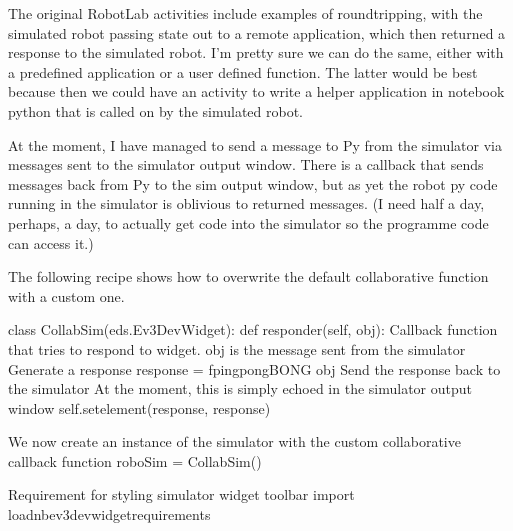 \documentclass[letterpaper,10pt,english]{sphinxmanual}
\begin{document}
The original RobotLab activities include examples of round\sphinxhyphen{}tripping, with the simulated robot passing state out to a remote application, which then returned a response to the simulated robot. I’m pretty sure we can do the same, either with a predefined application or a user defined function. The latter would be best because then we could have an activity to write a helper application in notebook python that is called on by the simulated robot.

At the moment, I have managed to send a message to Py from the simulator via messages sent to the simulator output window. There is a callback that sends messages back from Py to the sim output window, but as yet the robot py code running in the simulator is oblivious to returned messages. (I need half a day, perhaps, a day, to actually get code into the simulator so the programme code can access it.)

The following recipe shows how to overwrite the default collaborative  function with a custom one.

{
\begin{sphinxVerbatim}[commandchars=\\\{\}]
\llap{\color{nbsphinxin}[ ]:\,\hspace{\fboxrule}\hspace{\fboxsep}}class CollabSim(eds.Ev3DevWidget):
     def responder(self, obj):
        \PYGZdq{}\PYGZdq{}\PYGZdq{} Callback function that tries to respond to widget.\PYGZdq{}\PYGZdq{}\PYGZdq{}
        \PYGZsh{} obj is the message sent from the simulator
        \PYGZsh{}Generate a response
        response = f\PYGZsq{}pingpongBONG \PYGZob{}obj\PYGZcb{}\PYGZsq{}
        \PYGZsh{}Send the response back to the simulator
        \PYGZsh{}At the moment, this is simply echoed in the simulator output window
        self.set\PYGZus{}element(\PYGZdq{}response\PYGZdq{}, response)

\PYGZsh{} We now create an instance of the simulator with the custom collaborative callback function
roboSim = CollabSim()
\end{sphinxVerbatim}
}

{
\begin{sphinxVerbatim}[commandchars=\\\{\}]
\llap{\color{nbsphinxin}[ ]:\,\hspace{\fboxrule}\hspace{\fboxsep}}\PYGZsh{}Requirement for styling simulator widget toolbar
import \PYGZus{}load\PYGZus{}nbev3devwidget\PYGZus{}requirements
\end{sphinxVerbatim}
}
\end{document}
